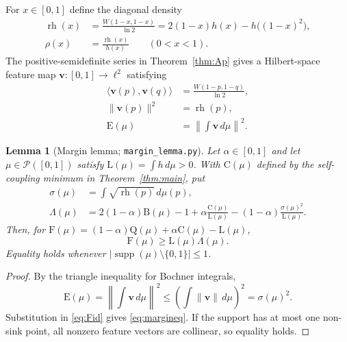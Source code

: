 \documentclass[11pt]{article}
\theoremstyle{plain}
\newtheorem{lemma}[theorem]{Lemma}
\theoremstyle{definition}
\theoremstyle{remark}
\DeclareMathOperator{\supp}{supp}
\newcommand{\PP}{\mathcal P}
\newcommand{\rh}{\operatorname{rh}}
\newcommand{\Lb}{\mathrm{L}}
\newcommand{\Bb}{\mathrm{B}}
\newcommand{\Cc}{\mathrm{C}}
\newcommand{\Qq}{\mathrm{Q}}
\newcommand{\Ee}{\mathrm{E}}
\newcommand{\Ff}{\mathrm{F}}
\newcommand{\Lh}{\Lambda}
\begin{document}
For $x\in[0,1]$ define the diagonal density
\begin{align}
\rh(x)
&=\frac{W(1-x,1-x)}{\ln2}
=2(1-x)h(x)-h\bigl((1-x)^2\bigr),
  \label{eq:rhdiag}\\
\rho(x)&=\frac{\rh(x)}{h(x)}\qquad(0<x<1).
\end{align}
The positive-semidefinite series in Theorem~\ref{thm:Ap} gives a Hilbert-space
feature map $\mathbf v:[0,1]\to\ell^2$ satisfying
\begin{align*}
\langle\mathbf v(p),\mathbf v(q)\rangle
&=\frac{W(1-p,1-q)}{\ln2},\\
\|\mathbf v(p)\|^2&=\rh(p),\\
\Ee(\mu)&=\left\|\int\mathbf v\,d\mu\right\|^2.
\end{align*}

\begin{lemma}[Margin lemma; \texttt{margin\_lemma.py}]
\label{lem:margin}
Let $\alpha\in[0,1]$ and let $\mu\in\PP([0,1])$ satisfy
$\Lb(\mu)=\int h\,d\mu>0$.  With $\Cc(\mu)$ defined by the self-coupling
minimum in Theorem~\ref{thm:main}, put
\begin{align*}
\sigma(\mu)&=\int\sqrt{\rh(p)}\,d\mu(p),\\
\Lh(\mu)&=2(1-\alpha)\Bb(\mu)-1
+\alpha\frac{\Cc(\mu)}{\Lb(\mu)}
-(1-\alpha)\frac{\sigma(\mu)^2}{\Lb(\mu)}.
\end{align*}
Then, for
$\Ff(\mu)=(1-\alpha)\Qq(\mu)+\alpha\Cc(\mu)-\Lb(\mu)$,
\begin{equation}
\Ff(\mu)\ge\Lb(\mu)\Lh(\mu).
\label{eq:margineq}
\end{equation}
Equality holds whenever
$|\supp(\mu)\setminus\{0,1\}|\le1$.
\end{lemma}

\begin{proof}
By the triangle inequality for Bochner integrals,
\[
\Ee(\mu)=\left\|\int\mathbf v\,d\mu\right\|^2
\le\left(\int\|\mathbf v\|\,d\mu\right)^2=\sigma(\mu)^2.
\]
Substitution in \eqref{eq:Fid} gives \eqref{eq:margineq}.  If the support has
at most one non-sink point, all nonzero feature vectors are collinear, so
equality holds. \qedhere
\end{proof}
\end{document}
